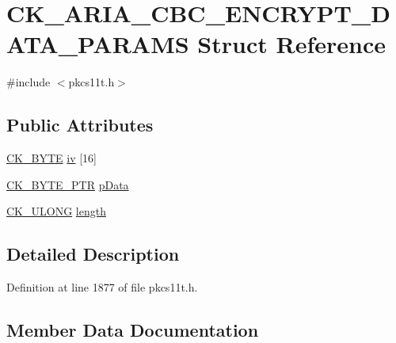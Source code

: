 \hypertarget{struct_c_k___a_r_i_a___c_b_c___e_n_c_r_y_p_t___d_a_t_a___p_a_r_a_m_s}{}\section{C\+K\+\_\+\+A\+R\+I\+A\+\_\+\+C\+B\+C\+\_\+\+E\+N\+C\+R\+Y\+P\+T\+\_\+\+D\+A\+T\+A\+\_\+\+P\+A\+R\+A\+MS Struct Reference}
\label{struct_c_k___a_r_i_a___c_b_c___e_n_c_r_y_p_t___d_a_t_a___p_a_r_a_m_s}


{\ttfamily \#include $<$pkcs11t.\+h$>$}

\subsection*{Public Attributes}
\begin{DoxyCompactItemize}
\item 
\hyperlink{pkcs11t_8h_a51e605f881c86838bf12d70707b57b85}{C\+K\+\_\+\+B\+Y\+TE} \hyperlink{struct_c_k___a_r_i_a___c_b_c___e_n_c_r_y_p_t___d_a_t_a___p_a_r_a_m_s_acc009f272091e05095f5ccdeb09c9471}{iv} \mbox{[}16\mbox{]}
\item 
\hyperlink{pkcs11t_8h_a3d7233a4077fbaf7ae76b64da0a62a21}{C\+K\+\_\+\+B\+Y\+T\+E\+\_\+\+P\+TR} \hyperlink{struct_c_k___a_r_i_a___c_b_c___e_n_c_r_y_p_t___d_a_t_a___p_a_r_a_m_s_a453bfa7f583fe403750f16ec44c91299}{p\+Data}
\item 
\hyperlink{pkcs11t_8h_a35181858a3b7a0a81f49d180d8f446ef}{C\+K\+\_\+\+U\+L\+O\+NG} \hyperlink{struct_c_k___a_r_i_a___c_b_c___e_n_c_r_y_p_t___d_a_t_a___p_a_r_a_m_s_af1cb90e29189fac199d9d67400d1d03c}{length}
\end{DoxyCompactItemize}


\subsection{Detailed Description}


Definition at line 1877 of file pkcs11t.\+h.



\subsection{Member Data Documentation}
\mbox{\label{struct_c_k___a_r_i_a___c_b_c___e_n_c_r_y_p_t___d_a_t_a___p_a_r_a_m_s_acc009f272091e05095f5ccdeb09c9471}} 
